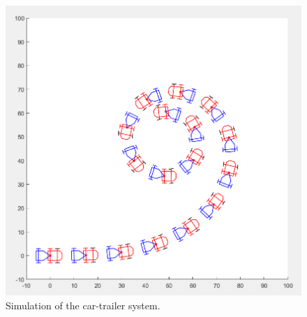 \documentclass{article}
\begin{document}
\begin{figure}[H]
\centerline{\includegraphics{figures/simulation}}
\caption{Simulation of the car-trailer system.}
\label{fig:figure2}
\end{figure}
\end{document}
